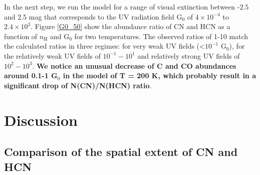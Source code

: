 \documentclass{aa}
\begin{document}
In the next step, we run the model for a
range of visual extinction between -$2.5$ and 2.5 mag that corresponds to
the UV radiation field G$_0$ of $4\times 10^{-4}$ to $2.4\times 10^{3}$. 
Figure \ref{G0_50} show the abundance ratio of CN and HCN as a function of
$n_\mathrm{H}$ and G$_0$ for two temperatures. The observed ratios 
of 1-10 match the calculated ratios in three regimes: for very weak UV fields (<$10^{-1}$ G$_0$),
for the relatively weak UV fields of $10^{-1}-10^1$ and relatively strong UV fields of $10^{2}-10^3$.
\textbf{We notice an unusual decrease of C and CO abundances around 0.1-1 G$_0$ in the model of T = 200 K, which probably result in a significant drop of N(CN)/N(HCN) ratio}.

%
\section{Discussion}
\label{section:discussion}

\subsection{Comparison of the spatial extent of CN and HCN}
\label{subsection:extent}
\end{document}
